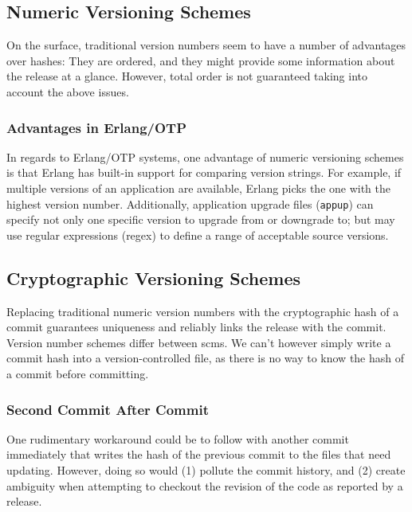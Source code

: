 \subsection{Numeric Versioning Schemes}
On the surface, traditional version numbers seem to have a number of advantages over hashes: They are ordered, and they might provide some information about the release at a glance. However, total order is not guaranteed taking into account the above issues.

\subsubsection{Advantages in Erlang/OTP}
In regards to Erlang/OTP systems, one advantage of numeric versioning schemes is that Erlang has built-in support for comparing version strings. For example, if multiple versions of an application are available, Erlang picks the one with the highest version number. Additionally, application upgrade files (\lstinline|appup|) can specify not only one specific version to upgrade from or downgrade to; but may use regular expressions (regex) to define a range of acceptable source versions.\cite{cesarini:otp}

\subsection{Cryptographic Versioning Schemes}
Replacing traditional numeric version numbers with the cryptographic hash of a commit guarantees uniqueness and reliably links the release with the commit. Version number schemes differ between \acrfull{scm}s. We can't however simply write a commit hash into a version-controlled file, as there is no way to know the hash of a commit before committing.

\subsubsection{Second Commit After Commit}
One rudimentary workaround could be to follow with another commit immediately that writes the hash of the previous commit to the files that need updating. However, doing so would (1) pollute the commit history, and (2) create ambiguity when attempting to checkout the revision of the code as reported by a release.

